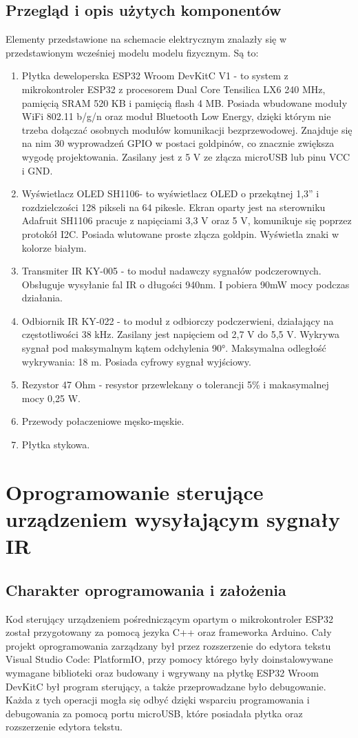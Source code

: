 \documentclass[12pt,twoside]{article}
\begin{document}
\subsection{Przegląd i opis użytych komponentów}
Elementy przedstawione na schemacie elektrycznym znalazły się w przedstawionym wcześniej modelu modelu fizycznym. Są to:
\begin{enumerate}[label=\alph*), leftmargin=1.25cm]
   \item Płytka deweloperska ESP32 Wroom DevKitC V1\cite{doitDevKitV1} - to system z mikrokontroler ESP32 z procesorem Dual Core Tensilica LX6 240 MHz, pamięcią SRAM 520 KB i pamięcią flash 4 MB. Posiada wbudowane moduły WiFi 802.11 b/g/n oraz moduł Bluetooth Low Energy, dzięki którym nie trzeba dołączać osobnych modułów komunikacji bezprzewodowej. Znajduje się na nim 30 wyprowadzeń GPIO w postaci goldpinów, co znacznie zwiększa wygodę projektowania. Zasilany jest z 5 V ze złącza microUSB lub pinu VCC i GND.
   \item Wyświetlacz OLED SH1106\cite{sh1106}- to wyświetlacz OLED o przekątnej 1,3'' i rozdzielczości 128 pikseli na 64 pikesle. Ekran oparty jest na sterowniku Adafruit SH1106 pracuje z napięciami 3,3 V oraz 5 V, komunikuje się poprzez protokół I2C. Posiada wlutowane proste złącza goldpin. Wyświetla znaki w kolorze białym.
   \item Transmiter IR KY-005\cite{ky005} - to moduł nadawczy sygnałów podczerownych. Obsługuje wysyłanie fal IR o długości 940nm. I pobiera 90mW mocy podczas działania.
   \item Odbiornik IR KY-022\cite{ky022}  - to moduł z odbiorczy podczerwieni, działający na częstotliwości 38 kHz. Zasilany jest napięciem od 2,7 V do 5,5 V. Wykrywa sygnał pod maksymalnym kątem odchylenia 90°. Maksymalna odległość wykrywania: 18 m. Posiada cyfrowy sygnał wyjściowy.
   \item Rezystor 47 Ohm - resystor przewlekany o tolerancji 5\% i makasymalnej mocy 0,25 W.
   \item Przewody połaczeniowe męsko-męskie.
   \item Płytka stykowa.
\end{enumerate}

\clearpage

\section{Oprogramowanie sterujące urządzeniem wysyłającym sygnały IR}
\subsection{Charakter oprogramowania i założenia}
Kod sterujący urządzeniem pośredniczącym opartym o mikrokontroler ESP32 został przygotowany za pomocą jezyka C++ oraz frameworka Arduino. Cały projekt oprogramowania zarządzany był przez rozszerzenie do edytora tekstu Visual Studio Code: PlatformIO, przy pomocy którego były doinstalowywane wymagane biblioteki oraz budowany i wgrywany na płytkę ESP32 Wroom DevKitC był program sterujący, a także przeprowadzane było debugowanie. Każda z tych operacji mogła się odbyć dzięki wsparciu programowania i debugowania za pomocą portu microUSB, które posiadała płytka oraz rozszerzenie edytora tekstu.
\end{document}
